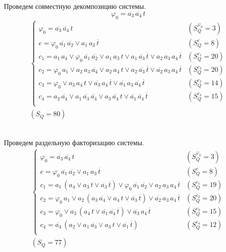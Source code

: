 \documentclass{article}
\begin{document}
\noindent\begin{minipage}{\textwidth}
Проведем совместную декомпозицию системы. \[\varphi_{0} = \overline{a_3}\,\overline{a_4}\,t\]
\[\begin{matrix}
    \begin{cases}
        \varphi_{0} = \overline{a_3}\,\overline{a_4}\,t & (S_Q^{\varphi_{0}} = 3) \\
        e = \varphi_{0}\,\overline{a_1}\,\overline{a_2} \lor a_1\,a_3\,\overline{t} & (S_Q^{e} = 8) \\
        c_1 = a_1\,a_4 \lor \varphi_{0}\,\overline{a_1}\,\overline{a_2} \lor a_1\,a_3\,t \lor a_1\,\overline{a_3}\,\overline{t} \lor a_2\,a_3\,a_4\,\overline{t} & (S_Q^{c_1} = 20) \\
        c_2 = \varphi_{0}\,a_1 \lor a_2\,a_3\,\overline{a_4} \lor a_2\,a_4\,t \lor a_2\,\overline{a_3}\,\overline{t} \lor \overline{a_2}\,a_3\,a_4\,\overline{t} & (S_Q^{c_2} = 20) \\
        c_3 = \varphi_{0} \lor a_3\,a_4\,t \lor \overline{a_3}\,a_4\,\overline{t} \lor \overline{a_1}\,a_3\,\overline{a_4}\,\overline{t} & (S_Q^{c_3} = 14) \\
        c_4 = a_2\,\overline{a_4} \lor a_1\,\overline{a_3}\,\overline{a_4} \lor a_3\,\overline{a_4}\,t \lor \overline{a_1}\,\overline{a_4}\,\overline{t} & (S_Q^{c_4} = 15) \\
    \end{cases} \\ (S_Q = 80)
\end{matrix}\] \\ \phantom{0}
\end{minipage}
\noindent\begin{minipage}{\textwidth}
Проведем раздельную факторизацию системы.
\[\begin{matrix}
    \begin{cases}
        \varphi_{0} = \overline{a_3}\,\overline{a_4}\,t & (S_Q^{\varphi_{0}} = 3) \\
        e = \varphi_{0}\,\overline{a_1}\,\overline{a_2} \lor a_1\,a_3\,\overline{t} & (S_Q^{e} = 8) \\
        c_1 = a_1\,\left(a_4 \lor a_3\,t \lor \overline{a_3}\,\overline{t}\right) \lor \varphi_{0}\,\overline{a_1}\,\overline{a_2} \lor a_2\,a_3\,a_4\,\overline{t} & (S_Q^{c_1} = 19) \\
        c_2 = \varphi_{0}\,a_1 \lor a_2\,\left(a_3\,\overline{a_4} \lor a_4\,t \lor \overline{a_3}\,\overline{t}\right) \lor \overline{a_2}\,a_3\,a_4\,\overline{t} & (S_Q^{c_2} = 20) \\
        c_3 = \varphi_{0} \lor a_3\,\left(a_4\,t \lor \overline{a_1}\,\overline{a_4}\,\overline{t}\right) \lor \overline{a_3}\,a_4\,\overline{t} & (S_Q^{c_3} = 15) \\
        c_4 = \overline{a_4}\,\left(a_2 \lor a_1\,\overline{a_3} \lor a_3\,t \lor \overline{a_1}\,\overline{t}\right) & (S_Q^{c_4} = 12) \\
    \end{cases} \\ (S_Q = 77)
\end{matrix}\] \\ \phantom{0}
\end{minipage}
\end{document}
